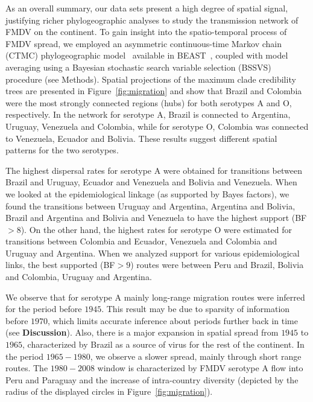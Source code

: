 \documentclass[10pt]{article}
\begin{document}
As an overall summary, our data sets present a high degree of spatial signal, justifying richer phylogeographic analyses to study the transmission network of FMDV on the continent.
To gain insight into the spatio-temporal process of FMDV spread, we employed an asymmetric continuous-time Markov chain (CTMC) phylogeographic model~\cite{roots} available in BEAST~\cite{beast2012}, coupled  with model averaging using a Bayesian stochastic search variable selection (BSSVS) procedure (see Methods).
Spatial projections of the maximum clade credibility trees are presented in Figure~\ref{fig:migration} and show that Brazil and Colombia were the most strongly connected regions (hubs) for both serotypes A and O, respectively. 
In the network for serotype A, Brazil is connected to Argentina, Uruguay, Venezuela and Colombia, while for serotype O, Colombia was connected to Venezuela, Ecuador and Bolivia.
These results suggest different spatial patterns for the two serotypes.

The highest dispersal rates for serotype A were obtained for transitions between Brazil and Uruguay, Ecuador and Venezuela and Bolivia and Venezuela.
When we looked at the epidemiological linkage (as supported by Bayes factors), we found the transitions between Uruguay and Argentina, Argentina and Bolivia, Brazil and Argentina and Bolivia and Venezuela to have the highest support (BF$>8$).
On the other hand, the highest rates for serotype O were estimated for transitions between Colombia and Ecuador, Venezuela and Colombia and Uruguay and Argentina.
When we analyzed support for various epidemiological links, the best supported (BF$>9$) routes were between Peru and Brazil, Bolivia and Colombia, Uruguay and Argentina.

We observe that for serotype A mainly long-range migration routes were inferred for the period before $1945$.
This result may be due to sparsity of information before $1970$, which limits accurate inference about periods further back in time (see {\bf Discussion}). 
Also, there is a major expansion in spatial spread from $1945$ to $1965$, characterized by Brazil as a source of virus for the rest of the continent.
In the period $1965-1980$, we observe a slower spread, mainly through short range routes.
The $1980-2008$ window is characterized by FMDV serotype A flow into Peru and Paraguay and the increase of intra-country diversity (depicted by the radius of the displayed circles in Figure~\ref{fig:migration}).   
\end{document}
